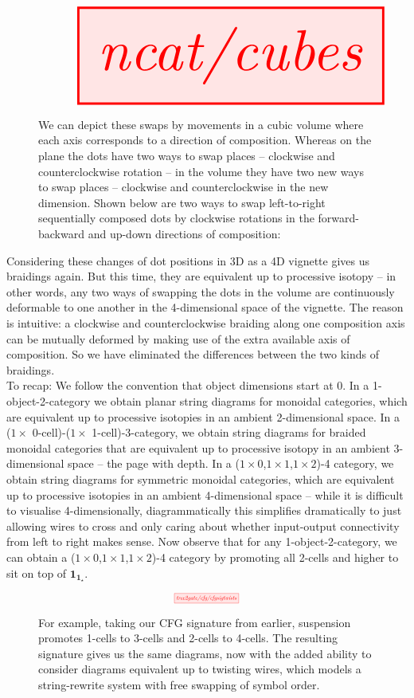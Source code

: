\begin{figure}[h!]
\centering
\[\resizebox{\textwidth}{!}{\tikzfig{ncat/cubes}}\]
\caption{We can depict these swaps by movements in a cubic volume where each axis corresponds to a direction of composition. Whereas on the plane the dots have two ways to swap places -- clockwise and counterclockwise rotation -- in the volume they have two new ways to swap places -- clockwise and counterclockwise in the new dimension. Shown below are two ways to swap left-to-right sequentially composed dots by clockwise rotations in the forward-backward and up-down directions of composition:}
\end{figure}

Considering these changes of dot positions in 3D as a 4D vignette gives us braidings again. But this time, they are equivalent up to processive isotopy -- in other words, any two ways of swapping the dots in the volume are continuously deformable to one another in the 4-dimensional space of the vignette. The reason is intuitive: a clockwise and counterclockwise braiding along one composition axis can be mutually deformed by making use of the extra available axis of composition. So we have eliminated the differences between the two kinds of braidings.\\

To recap: We follow the convention that object dimensions start at 0. In a 1-object-2-category we obtain planar string diagrams for monoidal categories, which are equivalent up to processive isotopies in an ambient 2-dimensional space. In a ($1 \times$ 0-cell)-($1\times$ 1-cell)-3-category, we obtain string diagrams for braided monoidal categories that are equivalent up to processive isotopy in an ambient 3-dimensional space -- the page with depth. In a ($1\times 0$,$1\times 1$,$1\times 2$)-4 category, we obtain string diagrams for symmetric monoidal categories, which are equivalent up to processive isotopies in an ambient 4-dimensional space -- while it is difficult to visualise 4-dimensionally, diagrammatically this simplifies dramatically to just allowing wires to cross and only caring about whether input-output connectivity from left to right makes sense. Now observe that for any 1-object-2-category, we can obtain a ($1\times 0$,$1\times 1$,$1\times 2$)-4 category by promoting all 2-cells and higher to sit on top of $\textbf{1}_{\textbf{1}_\star}$.

\begin{figure}[h!]
\centering
\[\scalebox{0.5}{\tikzfig{tree2gate/cfg/cfgsigtwists}}\]
\caption{For example, taking our CFG signature from earlier, suspension promotes 1-cells to 3-cells and 2-cells to 4-cells. The resulting signature gives us the same diagrams, now with the added ability to consider diagrams equivalent up to twisting wires, which models a string-rewrite system with free swapping of symbol order.}
\end{figure}

